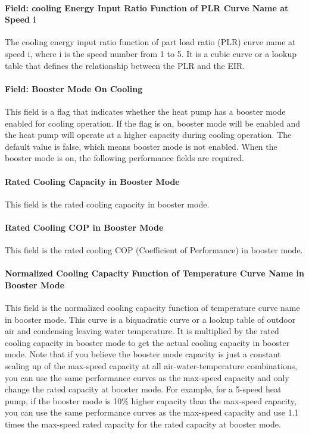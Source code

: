 \paragraph{Field: cooling Energy Input Ratio Function of PLR Curve Name at Speed
i} The cooling energy input ratio function of part load ratio (PLR) curve name
at speed i, where i is the speed number from 1 to 5. It is a cubic curve or a
lookup table that defines the relationship between the PLR and the EIR.
\paragraph{Field: Booster Mode On Cooling} This field is a flag that indicates
whether the heat pump has a booster mode enabled for cooling operation. If the
flag is on, booster mode will be enabled and the heat pump will operate at a
higher capacity during cooling operation. The default value is false, which
means booster mode is not enabled. When the booster mode is on, the following
performance fields are required.
\paragraph{Rated Cooling Capacity in Booster Mode} This field is the rated
cooling capacity in booster mode.
\paragraph{Rated Cooling COP in Booster Mode} This field is the rated cooling
COP (Coefficient of Performance) in booster mode.
\paragraph{Normalized Cooling Capacity Function of Temperature Curve Name in
Booster Mode} This field is the normalized cooling capacity function of
temperature curve name in booster mode. This curve is a biquadratic curve or a
lookup table of outdoor air and condensing leaving water temperature. It is
multiplied by the rated cooling capacity in booster mode to get the actual
cooling capacity in booster mode. Note that if you believe the booster mode
capacity is just a constant scaling up of the max-speed capacity at all
air-water-temperature combinations, you can use the same performance curves as
the max-speed capacity and only change the rated capacity at booster mode.
For example, for a 5-speed heat pump, if the booster mode is 10\% higher capacity
than the max-speed capacity, you can use the same performance curves as the max-speed
capacity and use 1.1 times the max-speed rated capacity for the rated capacity at booster mode.
